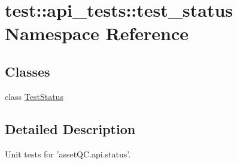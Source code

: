 \hypertarget{namespacetest_1_1api__tests_1_1test__status}{\section{test\-:\-:api\-\_\-tests\-:\-:test\-\_\-status \-Namespace \-Reference}
\label{d2/d6d/namespacetest_1_1api__tests_1_1test__status}
}
\subsection*{\-Classes}
\begin{DoxyCompactItemize}
\item 
class \hyperlink{classtest_1_1api__tests_1_1test__status_1_1TestStatus}{\-Test\-Status}
\end{DoxyCompactItemize}


\subsection{\-Detailed \-Description}
\begin{DoxyVerb}
Unit tests for 'assetQC.api.status'.
\end{DoxyVerb}
 